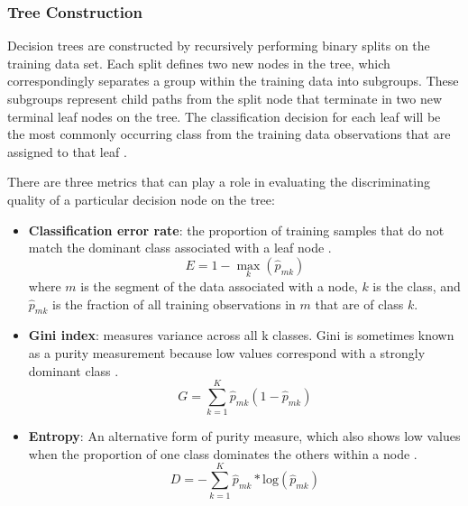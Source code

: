 \subsubsection{Tree Construction}
Decision trees are constructed by recursively performing binary splits on the training data set. Each split defines two new nodes in the tree, which correspondingly separates a group within the training data into subgroups. These subgroups represent child paths from the split node that terminate in two new terminal leaf nodes on the tree. The classification decision for each leaf will be the most commonly occurring class from the training data observations that are assigned to that leaf \citep[p. 311]{james_introduction_2013}.

There are three metrics that can play a role in evaluating the discriminating quality of a particular decision node on the tree:

\begin{itemize}[itemsep=2pt]\label{ch5:impurity}
    \item \textbf{Classification error rate}: the proportion of training samples that do not match the dominant class associated with a leaf node \citep[p. 312]{james_introduction_2013}.
    \begin{equation}
    \label{eq:error_rate}
        E = 1 - \max_k(\hat{p}_{mk})
    \end{equation}
    where $m$ is the segment of the data associated with a node, $k$ is the class, and $\hat{p}_{mk}$ is the fraction of all training observations in $m$ that are of class $k$. 
    \item \textbf{Gini index}: measures variance across all k classes. Gini is sometimes known as a purity measurement because low values correspond with a strongly dominant class \citep[p. 312]{james_introduction_2013}.
    \begin{equation}
    \label{eq:gini}
        G = \sum_{k=1}^{K}{\hat{p}_{mk}(1-\hat{p}_{mk})}
    \end{equation}
    \item \textbf{Entropy}: An alternative form of purity measure, which also shows low values when the proportion of one class dominates the others within a node \citep[p. 312]{james_introduction_2013}.
    \begin{equation}
    \label{eq:entropy}
        D = -\sum_{k=1}^{K}{\hat{p}_{mk}* \text{log}(\hat{p}_{mk})}
    \end{equation}
\end{itemize}

